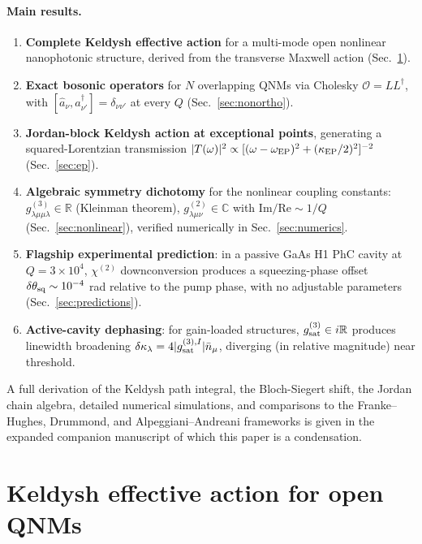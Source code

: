 \documentclass[11pt]{article}
\newcommand{\EP}{{\rm EP}}
\newcommand{\calO}{\mathcal{O}}
\begin{document}
\paragraph{Main results.}
\begin{enumerate}\itemsep0em
\item \textbf{Complete Keldysh effective action} for a multi-mode
   open nonlinear nanophotonic structure, derived from the transverse
   Maxwell action (Sec.~\ref{sec:action}).
\item \textbf{Exact bosonic operators} for $N$ overlapping QNMs via
   Cholesky $\calO=LL^\dagger$, with $[\hat a_\nu,\hat a_{\nu'}^\dagger]
   =\delta_{\nu\nu'}$ at every $Q$ (Sec.~\ref{sec:nonortho}).
\item \textbf{Jordan-block Keldysh action at exceptional points},
   generating a squared-Lorentzian transmission
   $|T(\omega)|^2\propto[(\omega-\omega_\EP)^2+(\kappa_\EP/2)^2]^{-2}$
   (Sec.~\ref{sec:ep}).
\item \textbf{Algebraic symmetry dichotomy} for the nonlinear
   coupling constants:
   $g^{(3)}_{\lambda\mu\mu\lambda}\in\mathbb{R}$ (Kleinman theorem),
   $g^{(2)}_{\lambda\mu\nu}\in\mathbb{C}$ with
   $\mathrm{Im}/\mathrm{Re}\sim 1/Q$
   (Sec.~\ref{sec:nonlinear}), verified numerically in
   Sec.~\ref{sec:numerics}.
\item \textbf{Flagship experimental prediction}: in a passive GaAs H1
   PhC cavity at $Q=3\times 10^4$, $\chi^{(2)}$ downconversion produces
   a squeezing-phase offset $\delta\theta_{\rm sq}\sim 10^{-4}$ rad
   relative to the pump phase, with no adjustable parameters
   (Sec.~\ref{sec:predictions}).
\item \textbf{Active-cavity dephasing}: for gain-loaded structures,
   $g^{(3)}_{\rm sat}\in i\mathbb{R}$ produces linewidth broadening
   $\delta\kappa_\lambda=4|g^{(3),I}_{\rm sat}|\bar{n}_\mu$, diverging
   (in relative magnitude) near threshold.
\end{enumerate}

A full derivation of the Keldysh path integral, the Bloch-Siegert
shift, the Jordan chain algebra, detailed numerical simulations, and
comparisons to the Franke--Hughes, Drummond, and Alpeggiani--Andreani
frameworks is given in the expanded companion manuscript of which
this paper is a condensation.

\section{Keldysh effective action for open QNMs}
\label{sec:action}
\end{document}
